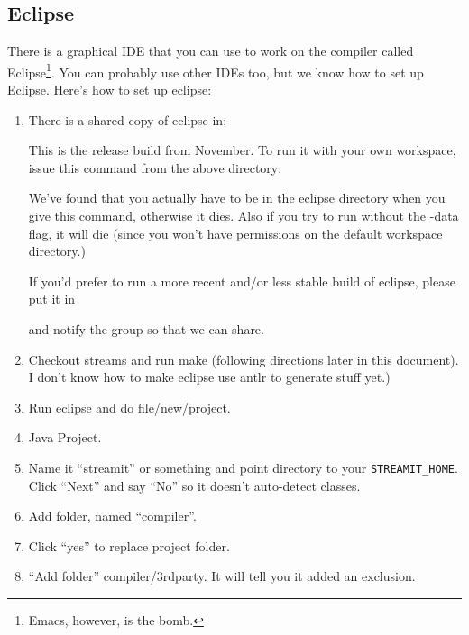 \subsection{Eclipse}
There is a graphical IDE that you can use to work on the compiler
called Eclipse\footnote{Emacs, however, is the bomb.}. You can
probably use other IDEs too, but we know how to set up Eclipse.
Here's how to set up eclipse:
\begin{enumerate}

\item There is a shared copy of eclipse in:


This is the release build from November.  To run it with your own
workspace, issue this command from the above directory:


We've found that you actually have to be in the eclipse directory when
you give this command, otherwise it dies.  Also if you try to run
without the -data flag, it will die (since you won't have permissions
on the default workspace directory.)

If you'd prefer to run a more recent and/or less stable build of
eclipse, please put it in 


\noindent and notify the group so that we can share.

\item Checkout streams and run make (following directions later in
 this document).  I don't know how to make eclipse use antlr to
 generate stuff yet.)

\item Run eclipse and do file/new/project.

\item Java Project.

\item Name it ``streamit'' or something and point directory to your
{\tt STREAMIT\_HOME}.  Click ``Next'' and say ``No'' so it doesn't
auto-detect classes.

\item Add folder, named ``compiler''.

\item Click ``yes'' to replace project folder.

\item ``Add folder'' compiler/3rdparty.  It will tell you it added an
   exclusion.


\end{enumerate}
